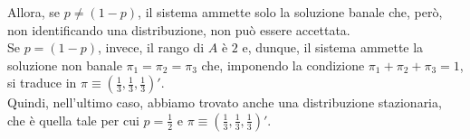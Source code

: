 \documentclass[12pt]{homework}
\begin{document}
 Allora, se $p\neq \left(1-p\right)$, il sistema ammette solo la soluzione banale che, però, non identificando una distribuzione, non può essere accettata.\\
 Se $p=\left(1-p\right)$, invece, il rango di $A$ è $2$ e, dunque, il sistema ammette la soluzione non banale $\pi_{1}=\pi_{2}=\pi_{3}$ che, imponendo la condizione $\pi_{1}+\pi_{2}+\pi_{3}=1$, si traduce in $\pi\equiv\left(\frac{1}{3},\frac{1}{3},\frac{1}{3}\right)'$.\\
 Quindi, nell'ultimo caso, abbiamo trovato anche una distribuzione stazionaria, che è quella tale per cui $p=\frac{1}{2}$ e $\pi\equiv\left(\frac{1}{3},\frac{1}{3},\frac{1}{3}\right)'$.
 
 \newpage
\section{}%
\end{document}
